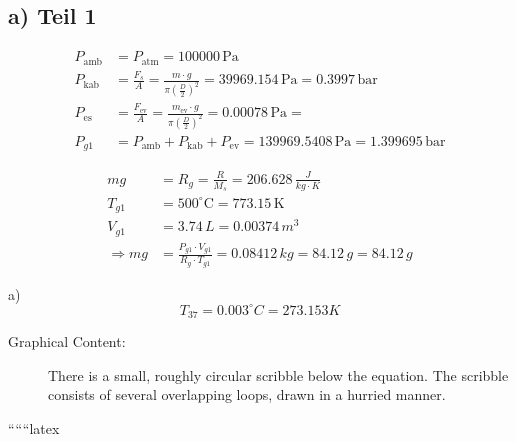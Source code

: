 \subsection*{a) Teil 1}

\begin{align*}
P_{\text{amb}} &= P_{\text{atm}} = 100000 \, \text{Pa} \\
P_{\text{kab}} &= \frac{F_s}{A} = \frac{m \cdot g}{\pi \left( \frac{D}{2} \right)^2} = 39969.154 \, \text{Pa} = 0.3997 \, \text{bar} \\
P_{\text{es}} &= \frac{F_{\text{ev}}}{A} = \frac{m_{\text{ev}} \cdot g}{\pi \left( \frac{D}{2} \right)^2} = 0.00078 \, \text{Pa} =  \\
P_{g1} &= P_{\text{amb}} + P_{\text{kab}} + P_{\text{ev}} = 139969.5408 \, \text{Pa} = 1.399695 \, \text{bar}
\end{align*}

\begin{align*}
mg &= R_g = \frac{R}{M_s} = 206.628 \, \frac{J}{kg \cdot K} \\
T_{g1} &= 500^\circ \text{C} = 773.15 \, \text{K} \\
V_{g1} &= 3.74 \, L = 0.00374 \, m^3 \\
\Rightarrow mg &= \frac{P_{g1} \cdot V_{g1}}{R_g \cdot T_{g1}} = 0.08412 \, kg = 84.12 \, g = 84.12 \, g
\end{align*}

a) \[ T_{37} = 0.003^\circ C = 273.153 K \]

\begin{description}
    \item[Graphical Content:] There is a small, roughly circular scribble below the equation. The scribble consists of several overlapping loops, drawn in a hurried manner.
\end{description}

``````latex